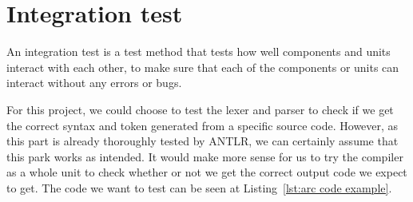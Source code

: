 \section{Integration test}\label{subsec:integrationtest}


An integration test is a test method that tests how well components and units interact with each other, to make sure that each of the components or units can interact without any errors or bugs. 


For this project, we could choose to test the lexer and parser to check if we get the correct syntax and token generated from a specific source code. However, as this part is already thoroughly tested by ANTLR, we can certainly assume that this park works as intended. It would make more sense for us to try the compiler as a whole unit to check whether or not we get the correct output code we expect to get. The code we want to test can be seen at Listing~\ref{lst:arc code example}.



